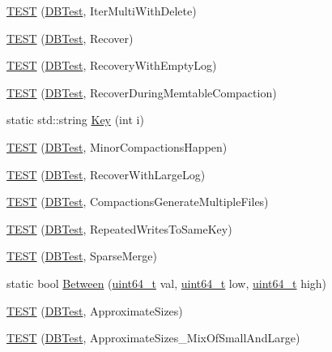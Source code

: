 \begin{DoxyCompactItemize}
\item 
\hyperlink{namespaceleveldb_a3e41cdc91355438f57b9497b01c66e24}{T\-E\-S\-T} (\hyperlink{classleveldb_1_1_d_b_test}{D\-B\-Test}, Iter\-Multi\-With\-Delete)
\item 
\hyperlink{namespaceleveldb_ab1872cabf2fb215814f9a6f1bacacc80}{T\-E\-S\-T} (\hyperlink{classleveldb_1_1_d_b_test}{D\-B\-Test}, Recover)
\item 
\hyperlink{namespaceleveldb_a890ebffd31d77bc8acb760088d70ee8c}{T\-E\-S\-T} (\hyperlink{classleveldb_1_1_d_b_test}{D\-B\-Test}, Recovery\-With\-Empty\-Log)
\item 
\hyperlink{namespaceleveldb_a2e24806457c57e7dec22e3c05e46a82c}{T\-E\-S\-T} (\hyperlink{classleveldb_1_1_d_b_test}{D\-B\-Test}, Recover\-During\-Memtable\-Compaction)
\item 
static std\-::string \hyperlink{namespaceleveldb_af5ebf23c4f21b4986d6f8fb430739287}{Key} (int i)
\item 
\hyperlink{namespaceleveldb_a1ff90ae7b19ecf46c5efb6e5af00fa0a}{T\-E\-S\-T} (\hyperlink{classleveldb_1_1_d_b_test}{D\-B\-Test}, Minor\-Compactions\-Happen)
\item 
\hyperlink{namespaceleveldb_a01bbbae1753711e8b7740ed8faa9efd6}{T\-E\-S\-T} (\hyperlink{classleveldb_1_1_d_b_test}{D\-B\-Test}, Recover\-With\-Large\-Log)
\item 
\hyperlink{namespaceleveldb_acd61524dbc544e8f1ca63fbdfac59791}{T\-E\-S\-T} (\hyperlink{classleveldb_1_1_d_b_test}{D\-B\-Test}, Compactions\-Generate\-Multiple\-Files)
\item 
\hyperlink{namespaceleveldb_acb51ac2eb77bd1af22372748f9fb44da}{T\-E\-S\-T} (\hyperlink{classleveldb_1_1_d_b_test}{D\-B\-Test}, Repeated\-Writes\-To\-Same\-Key)
\item 
\hyperlink{namespaceleveldb_a0ed510b8c03c1ca0216ffee81199d79e}{T\-E\-S\-T} (\hyperlink{classleveldb_1_1_d_b_test}{D\-B\-Test}, Sparse\-Merge)
\item 
static bool \hyperlink{namespaceleveldb_a891b358b4c0a10a44b24b8f473cc73fd}{Between} (\hyperlink{stdint_8h_aaa5d1cd013383c889537491c3cfd9aad}{uint64\-\_\-t} val, \hyperlink{stdint_8h_aaa5d1cd013383c889537491c3cfd9aad}{uint64\-\_\-t} low, \hyperlink{stdint_8h_aaa5d1cd013383c889537491c3cfd9aad}{uint64\-\_\-t} high)
\item 
\hyperlink{namespaceleveldb_a6b3f1122dc9d727f0c699ed3da2d6474}{T\-E\-S\-T} (\hyperlink{classleveldb_1_1_d_b_test}{D\-B\-Test}, Approximate\-Sizes)
\item 
\hyperlink{namespaceleveldb_a5c41c70ccd20279235316b8627f419da}{T\-E\-S\-T} (\hyperlink{classleveldb_1_1_d_b_test}{D\-B\-Test}, Approximate\-Sizes\-\_\-\-Mix\-Of\-Small\-And\-Large)

\end{DoxyCompactItemize}
